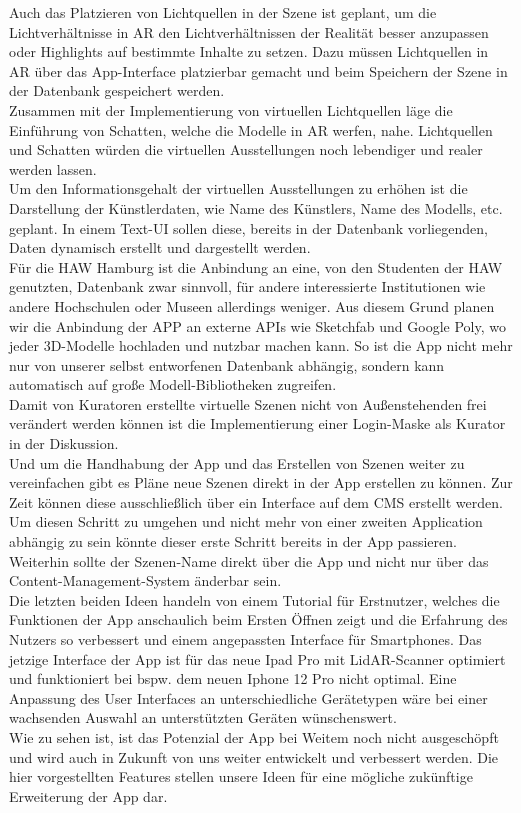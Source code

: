 \documentclass[titlepage, a4paper, 11pt]{scrartcl}
\begin{document}
  Auch das Platzieren von Lichtquellen in der Szene ist geplant, um die Lichtverhältnisse in AR den Lichtverhältnissen der Realität besser anzupassen oder Highlights auf bestimmte Inhalte zu setzen. Dazu müssen Lichtquellen in AR über das App-Interface platzierbar gemacht und beim Speichern der Szene in der Datenbank gespeichert werden.\\
  Zusammen mit der Implementierung von virtuellen Lichtquellen läge die Einführung von Schatten, welche die Modelle in AR werfen, nahe. Lichtquellen und Schatten würden die virtuellen Ausstellungen noch lebendiger und realer werden lassen.\\
  Um den Informationsgehalt der virtuellen Ausstellungen zu erhöhen ist die Darstellung der Künstlerdaten, wie Name des Künstlers, Name des Modells, etc. geplant. In einem Text-UI sollen diese, bereits in der Datenbank vorliegenden, Daten dynamisch erstellt und dargestellt werden.\\
  Für die HAW Hamburg ist die Anbindung an eine, von den Studenten der HAW genutzten, Datenbank zwar sinnvoll, für andere interessierte Institutionen wie andere Hochschulen oder Museen allerdings weniger. Aus diesem Grund planen wir die Anbindung der APP an externe APIs wie Sketchfab und Google Poly, wo jeder 3D-Modelle hochladen und nutzbar machen kann. So ist die App nicht mehr nur von unserer selbst entworfenen Datenbank abhängig, sondern kann automatisch auf große Modell-Bibliotheken zugreifen.\\
  Damit von Kuratoren erstellte virtuelle Szenen nicht von Außenstehenden frei verändert werden können ist die Implementierung einer Login-Maske als Kurator in der Diskussion.\\
  Und um die Handhabung der App und das Erstellen von Szenen weiter zu vereinfachen gibt es Pläne neue Szenen direkt in der App erstellen zu können. Zur Zeit können diese ausschließlich über ein Interface auf dem CMS erstellt werden. Um diesen Schritt zu umgehen und nicht mehr von einer zweiten Application abhängig zu sein könnte dieser erste Schritt bereits in der App passieren. Weiterhin sollte der Szenen-Name direkt über die App und nicht nur über das Content-Management-System änderbar sein.\\
  Die letzten beiden Ideen handeln von einem Tutorial für Erstnutzer, welches die Funktionen der App anschaulich beim Ersten Öffnen zeigt und die Erfahrung des Nutzers so verbessert und einem angepassten Interface für Smartphones. Das jetzige Interface der App ist für das neue Ipad Pro mit LidAR-Scanner optimiert und funktioniert bei bspw. dem neuen Iphone 12 Pro nicht optimal. Eine Anpassung des User Interfaces an unterschiedliche Gerätetypen wäre bei einer wachsenden Auswahl an unterstützten Geräten wünschenswert.\\

  Wie zu sehen ist, ist das Potenzial der App bei Weitem noch nicht ausgeschöpft und wird auch in Zukunft von uns weiter entwickelt und verbessert werden. Die hier vorgestellten Features stellen unsere Ideen für eine mögliche zukünftige Erweiterung der App dar.

  
  
\end{document}
